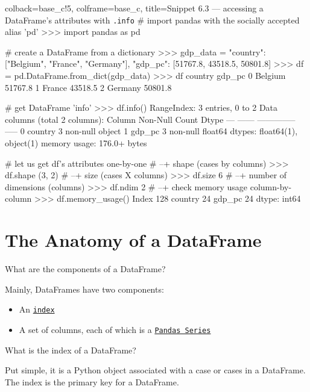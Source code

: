 \documentclass[a4paper,11pt]{book}
\newcommand{\question}[1]{%
    \begin{tcolorbox}[colback=comp_c!10,colframe=comp_c,sidebyside align=top,width=\linewidth,before skip=1ex]
        #1
    \end{tcolorbox}
    \switchcolumn%
}
\newcommand{\note}[1]{%
    \begin{tcolorbox}[colback=white!0,colframe=white!10,width=\linewidth,before skip=1ex]
        #1
    \end{tcolorbox}
}
\begin{document}
\begin{pythoncode}[linenos=true]{colback=base_c!5, colframe=base_c, title=\sffamily Snippet 6.3 --- accessing a DataFrame's attributes with \texttt{.info}}
# import pandas with the socially accepted alias 'pd'
>>> import pandas as pd

# create a DataFrame from a dictionary
>>> gdp_data = {
	"country": ["Belgium", "France", "Germany"],
	"gdp_pc": [51767.8, 43518.5, 50801.8]
    }
>>> df = pd.DataFrame.from_dict(gdp_data)
>>> df
   country   gdp_pc
0  Belgium  51767.8
1   France  43518.5
2  Germany  50801.8

# get DataFrame 'info'
>>> df.info()
RangeIndex: 3 entries, 0 to 2
Data columns (total 2 columns):
     Column   Non-Null Count  Dtype  
---  ------   --------------  -----  
 0   country  3 non-null      object 
 1   gdp_pc   3 non-null      float64
dtypes: float64(1), object(1)
memory usage: 176.0+ bytes

# let us get df's attributes one-by-one
# --+ shape (cases by columns)
>>> df.shape
(3, 2)
# --+ size (cases X columns)
>>> df.size
6
# --+ number of dimensions (columns)
>>> df.ndim
2
# --+ check memory usage column-by-column
>>> df.memory_usage()
Index      128
country     24
gdp_pc      24
dtype: int64

\end{pythoncode}

\section{The Anatomy of a DataFrame}

\begin{paracol}{2}
	\question{\raggedright What are the components of a DataFrame?}
	\note{Mainly, DataFrames have two components:
	
	\begin{itemize}
		\item An \href{https://pandas.pydata.org/docs/reference/api/pandas.DataFrame.index.html}{\texttt{index}}
		\item A set of columns, each of which is a \href{https://pandas.pydata.org/docs/reference/series.html}{\texttt{Pandas Series}}
	\end{itemize}
	}
\end{paracol}

\begin{paracol}{2}
	\question{\raggedright What is the index of a DataFrame?}
	\note{Put simple, it is a Python object associated with a case or cases in a DataFrame. The index is the primary key for a DataFrame.}
\end{paracol}
\end{document}
